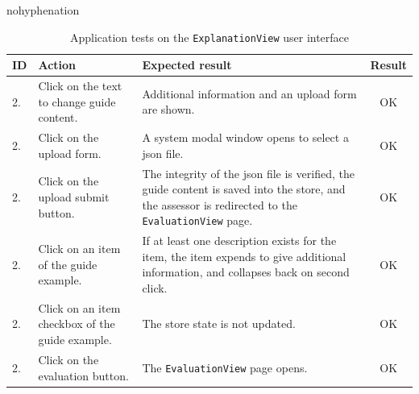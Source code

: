 \begin{hyphenrules}{nohyphenation}
	\begin{table}[ht]
		\begin{center}
			\begin{tabularx}{\textwidth}{l|p{4cm}Xc}
				\toprule[0.8mm]
				\textbf{ID} & \textbf{Action} & \textbf{Expected result} & \textbf{Result} \\
				\midrule[0.8mm] 
				\stepcounter{testsappcounter}
				2.\thetestsappcounter & Click on the text to change guide content. & Additional information and an upload form are shown. & \cellcolor{green!25}OK \\
				\midrule 
				\stepcounter{testsappcounter}
				2.\thetestsappcounter & Click on the upload form. & A system modal window opens to select a \gls{json} file. & \cellcolor{green!25}OK \\
				\midrule 
				\stepcounter{testsappcounter}
				2.\thetestsappcounter & Click on the upload submit button. & The integrity of the \gls{json} file is verified, the guide content is saved into the store, and the assessor is redirected to the \texttt{EvaluationView} page. & \cellcolor{green!25}OK \\
				\midrule 
				\stepcounter{testsappcounter}
				2.\thetestsappcounter & Click on an item of the guide example. & If at least one description exists for the item, the item expends to give additional information, and collapses back on second click. & \cellcolor{green!25}OK \\
				\midrule 
				\stepcounter{testsappcounter}
				2.\thetestsappcounter & Click on an item checkbox of the guide example. & The store state is not updated. & \cellcolor{green!25}OK \\
				\midrule 
				\stepcounter{testsappcounter}
				2.\thetestsappcounter & Click on the evaluation button. & The \texttt{EvaluationView} page opens. & \cellcolor{green!25}OK \\
				\bottomrule[0.8mm]
			\end{tabularx}
		\end{center}
		\caption*{Application tests on the \texttt{ExplanationView} user interface}
		\label{table:app_tests_ui_explanationview}
	\end{table}
\end{hyphenrules}

